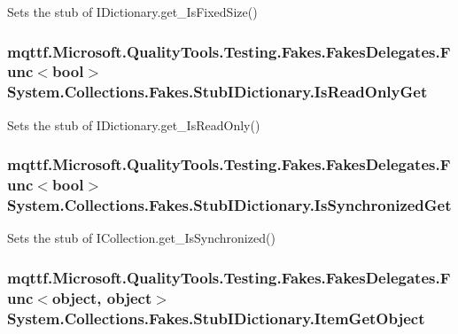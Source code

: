 Sets the stub of I\-Dictionary.\-get\-\_\-\-Is\-Fixed\-Size()

\hypertarget{class_system_1_1_collections_1_1_fakes_1_1_stub_i_dictionary_a6a9b5db28a1c61c0e2fd12baabd2379a}{
\subsubsection[{Is\-Read\-Only\-Get}]{\setlength{\rightskip}{0pt plus 5cm}mqttf.\-Microsoft.\-Quality\-Tools.\-Testing.\-Fakes.\-Fakes\-Delegates.\-Func$<$bool$>$ System.\-Collections.\-Fakes.\-Stub\-I\-Dictionary.\-Is\-Read\-Only\-Get}}\label{class_system_1_1_collections_1_1_fakes_1_1_stub_i_dictionary_a6a9b5db28a1c61c0e2fd12baabd2379a}


Sets the stub of I\-Dictionary.\-get\-\_\-\-Is\-Read\-Only()

\hypertarget{class_system_1_1_collections_1_1_fakes_1_1_stub_i_dictionary_a4f57ce63ee67138abad7f47f3a0c9a5f}{
\subsubsection[{Is\-Synchronized\-Get}]{\setlength{\rightskip}{0pt plus 5cm}mqttf.\-Microsoft.\-Quality\-Tools.\-Testing.\-Fakes.\-Fakes\-Delegates.\-Func$<$bool$>$ System.\-Collections.\-Fakes.\-Stub\-I\-Dictionary.\-Is\-Synchronized\-Get}}\label{class_system_1_1_collections_1_1_fakes_1_1_stub_i_dictionary_a4f57ce63ee67138abad7f47f3a0c9a5f}


Sets the stub of I\-Collection.\-get\-\_\-\-Is\-Synchronized()

\hypertarget{class_system_1_1_collections_1_1_fakes_1_1_stub_i_dictionary_abae912157ec8cbad25ff21b4d644299e}{
\subsubsection[{Item\-Get\-Object}]{\setlength{\rightskip}{0pt plus 5cm}mqttf.\-Microsoft.\-Quality\-Tools.\-Testing.\-Fakes.\-Fakes\-Delegates.\-Func$<$object, object$>$ System.\-Collections.\-Fakes.\-Stub\-I\-Dictionary.\-Item\-Get\-Object}}\label{class_system_1_1_collections_1_1_fakes_1_1_stub_i_dictionary_abae912157ec8cbad25ff21b4d644299e}


